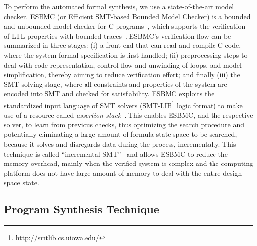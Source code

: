 \documentclass[journal]{IEEEtran}
\begin{document}
To perform the automated formal synthesis, we use a state-of-the-art model checker. ESBMC (or Efficient SMT-based Bounded Model Checker) is a bounded and unbounded model checker for C programs~\cite{esbmc2018}, which supports the verification of LTL properties with bounded traces~\cite{DBLP:journals/sosym/MorseCN015}. ESBMC's verification flow can be summarized in three stages: (i) a front-end that can read and compile C code, where the system formal specification is first handled; (ii) preprocessing steps to deal with code representation, control flow and unwinding of loops, and model simplification, thereby aiming to reduce verification effort; and finally (iii) the SMT solving stage, where all constraints and properties of the system are encoded into SMT and checked for satisfiability. ESBMC exploits the standardized input language of SMT solvers (SMT-LIB\footnote{\url{http://smtlib.cs.uiowa.edu/}} logic format) to make use of a resource called \textit{assertion stack}~\cite{Morse2015}. This enables ESBMC, and the respective solver, to learn from previous checks, thus optimizing the search procedure and potentially eliminating a large amount of formula state space to be searched, because it solves and disregards data during the process, incrementally. This technique is called ``incremental SMT''~\cite{DBLP:journals/fac/SchrammelKBMTB17} and allows ESBMC to reduce the memory overhead, mainly when the verified system is complex and the computing platform does not have large amount of memory to deal with the entire design space state.

%
\subsection{Program Synthesis Technique}
\label{sec:ProgramSynthesis}
\end{document}
